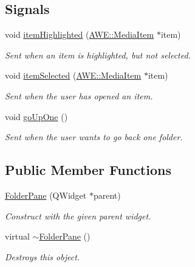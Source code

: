 \subsection*{Signals}
\begin{DoxyCompactItemize}
\item 
void \hyperlink{class_u_i_1_1_folder_pane_ad0b607bf3e89df4db37edd0ac34dbc32}{item\-Highlighted} (\hyperlink{class_a_w_e_1_1_media_item}{A\-W\-E\-::\-Media\-Item} $\ast$item)
\begin{DoxyCompactList}\small\item\em Sent when an item is highlighted, but not selected. \end{DoxyCompactList}\item 
void \hyperlink{class_u_i_1_1_folder_pane_a160d2f7f317e79acd31247753bf7ad0e}{item\-Selected} (\hyperlink{class_a_w_e_1_1_media_item}{A\-W\-E\-::\-Media\-Item} $\ast$item)
\begin{DoxyCompactList}\small\item\em Sent when the user has opened an item. \end{DoxyCompactList}\item 
\hypertarget{class_u_i_1_1_folder_pane_a8efd4359eeef781596ed7c0cdedfd527}{void \hyperlink{class_u_i_1_1_folder_pane_a8efd4359eeef781596ed7c0cdedfd527}{go\-Up\-One} ()}\label{class_u_i_1_1_folder_pane_a8efd4359eeef781596ed7c0cdedfd527}

\begin{DoxyCompactList}\small\item\em Sent when the user wants to go back one folder. \end{DoxyCompactList}\end{DoxyCompactItemize}
\subsection*{Public Member Functions}
\begin{DoxyCompactItemize}
\item 
\hyperlink{class_u_i_1_1_folder_pane_a3c9f4bdf70225df68d860520625853e7}{Folder\-Pane} (Q\-Widget $\ast$parent)
\begin{DoxyCompactList}\small\item\em Construct with the given parent widget. \end{DoxyCompactList}\item 
\hypertarget{class_u_i_1_1_folder_pane_a3693183c8ba2a015cb9086dd456b7c0d}{virtual \hyperlink{class_u_i_1_1_folder_pane_a3693183c8ba2a015cb9086dd456b7c0d}{$\sim$\-Folder\-Pane} ()}\label{class_u_i_1_1_folder_pane_a3693183c8ba2a015cb9086dd456b7c0d}

\begin{DoxyCompactList}\small\item\em Destroys this object. \end{DoxyCompactList}\end{DoxyCompactItemize}
